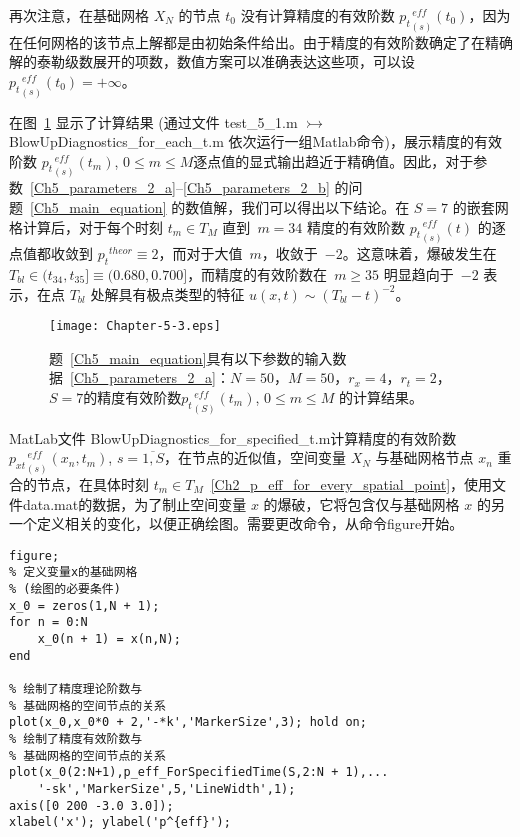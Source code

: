 \documentclass[twoside]{book}
\begin{document}
\begin{CJK*}{GBK}{song}
再次注意，在基础网格 $X_N$ 的节点 $t_0$ 没有计算精度的有效阶数  ${p_t}_{(s)}^{\, eff}(t_0)$，因为在任何网格的该节点上解都是由初始条件给出。由于精度的有效阶数确定了在精确解的泰勒级数展开的项数，数值方案可以准确表达这些项，可以设 ${p_t}_{(s)}^{\, eff}(t_0) = +\infty$。


在图~\ref{Fig_5_3} 显示了计算结果 (通过文件 test\_5\_1.m $\rightarrowtail$ BlowUpDiagnostics\_for\_each\_t.m 依次运行一组Matlab命令)，展示精度的有效阶数 ${p_t}^{\, eff}_{(s)}(t_m)$, $0 \leqslant m \leqslant M$逐点值的显式输出趋近于精确值。因此，对于参数~\eqref{Ch5_parameters_2_a}--\eqref{Ch5_parameters_2_b} 的问题~\eqref{Ch5_main_equation} 的数值解，我们可以得出以下结论。在 $S = 7$ 的嵌套网格计算后，对于每个时刻 $t_m \in T_M$ 直到~$m=34$ 精度的有效阶数 ${p_t}^{\, eff}_{(s)}(t)$ 的逐点值都收敛到 ${p_t}^{theor} \equiv 2$，而对于大值~$m$，收敛于~$-2$。这意味着，爆破发生在~$T_{bl} \in (t_{34},t_{35}] \equiv (0.680,0.700]$，而精度的有效阶数在~$m\geqslant35$ 明显趋向于~$-2$ 表示，在点 $T_{bl}$ 处解具有极点类型的特征 $u(x,t) \sim (T_{bl} - t)^{-2}$。
\begin{figure}[t]
    \centering
    \texttt{[image: Chapter-5-3.eps]}\\
    \caption{题~\eqref{Ch5_main_equation}具有以下参数的输入数据~\eqref{Ch5_parameters_2_a}：$N = 50$，$M = 50$，$r_x = 4$，$r_t = 2$，$S = 7$的精度有效阶数${p_t}^{\, eff}_{(S)}(t_m)$, $0 \leqslant m \leqslant M$ 的计算结果。}
    \label{Fig_5_3}
\end{figure}

MatLab文件 BlowUpDiagnostics\_for\_specified\_t.m计算精度的有效阶数${p_{xt}}^{\, eff}_{(s)}(x_n,t_m)$, $s = \overline{1,S}$，在节点的近似值，空间变量 $X_N$ 与基础网格节点 $x_n$ 重合的节点，在具体时刻 $t_m \in T_M$~\eqref{Ch2_p_eff_for_every_spatial_point}，使用文件data.mat的数据，为了制止空间变量 $x$ 的爆破，它将包含仅与基础网格 $x$ 的另一个定义相关的变化，以便正确绘图。需要更改命令，从命令figure开始。
%
\begin{lstlisting}
figure;
% 定义变量x的基础网格
% (绘图的必要条件)
x_0 = zeros(1,N + 1);
for n = 0:N
    x_0(n + 1) = x(n,N);
end

% 绘制了精度理论阶数与
% 基础网格的空间节点的关系
plot(x_0,x_0*0 + 2,'-*k','MarkerSize',3); hold on;
% 绘制了精度有效阶数与
% 基础网格的空间节点的关系
plot(x_0(2:N+1),p_eff_ForSpecifiedTime(S,2:N + 1),...
    '-sk','MarkerSize',5,'LineWidth',1);
axis([0 200 -3.0 3.0]);
xlabel('x'); ylabel('p^{eff}');
\end{lstlisting}



\end{CJK*}
\end{document}
